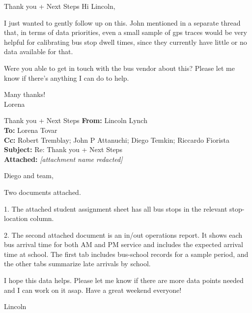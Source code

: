 {\begin{emailbox}{Thank you + Next Steps}
    \vspace{1em}
    Hi Lincoln, \vspace{1em}

    I just wanted to gently follow up on this. John mentioned in a separate thread that, in terms of data priorities, even a small sample of \acrshort{gps} traces would be very helpful for calibrating bus stop dwell times, since they currently have little or no data available for that. \vspace{1em}

    Were you able to get in touch with the bus vendor about this? Please let me know if there’s anything I can do to help. \vspace{1em}

    Many thanks! \\
    Lorena
\end{emailbox}

\begin{emailbox}{Thank you + Next Steps}
    \textbf{From:} Lincoln Lynch \\
    \textbf{To:} Lorena Tovar \\
    \textbf{Cc:} Robert Tremblay; John P Attanuchi; Diego Temkin; Riccardo Fiorista \\
    \textbf{Subject:} Re: Thank you + Next Steps \\
    \textbf{Attached:} \textit{[attachment name redacted]}

    \vspace{1em}
    Diego and team, \vspace{1em}

    Two documents attached.

    1. The attached student assignment sheet has all bus stops in the relevant stop-location column. \vspace{1em}

    2. The second attached document is an in/out operations report. It shows each bus arrival time for both AM and PM service and includes the expected arrival time at school. The first tab includes bus-school records for a sample period, and the other tabs summarize late arrivals by school. \vspace{1em}
    
    I hope this data helps. Please let me know if there are more data points needed and I can work on it asap. Have a great weekend everyone! \vspace{1em}
    
    Lincoln


\end{emailbox}}
